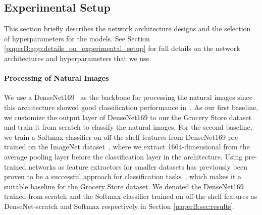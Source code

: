 \subsection{Experimental Setup}
\label{paperB:sec:experimental_setup}

This section briefly describes the network architecture designs and the selection of hyperparameters for the models. See Section \ref{paperB:app:details_on_experimental_setup} %
for full details on the network architectures and hyperparameters that we use.

\vspace{-3mm}
\paragraph{Processing of Natural Images} We use a DenseNet169~ as the backbone for processing the natural images since this architecture showed good classification performance in~. As our first baseline, we customize the output layer of DenseNet169 to our the Grocery Store dataset and train it from scratch to classify the natural images. For the second baseline, we train a Softmax classifier on off-the-shelf features from DenseNet169 pre-trained on the ImageNet dataset~, where we extract 1664-dimensional from the average pooling layer before the classification layer in the architecture. Using pre-trained networks as feature extractors for smaller datasets has previously been proven to be a successful approach for classification tasks~, which makes it a suitable baseline for the Grocery Store dataset. We denoted the DenseNet169 trained from scratch and the Softmax classifier trained on off-the-shelf features as DenseNet-scratch and Softmax respectively in Section \ref{paperB:sec:results}. %

\vspace{-3mm}
